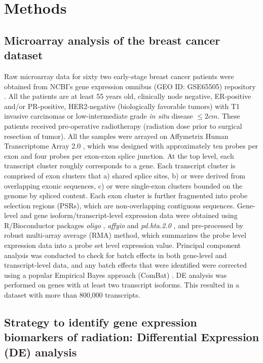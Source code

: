 \documentclass[hidelinks,11pt]{article}
\begin{document}
\section*{Methods}

\subsection*{Microarray analysis of the breast cancer dataset}

Raw microarray data for sixty two early-stage breast cancer patients were obtained from NCBI's gene expression omnibus (GEO ID: GSE65505) repository \cite{GEO}. All the patients are at least 55 years old, clinically node negative, ER-positive and/or PR-positive, HER2-negative (biologically favorable tumors) with T1 invasive carcinomas or low-intermediate grade \emph{in situ} disease $\leq 2cm$. These patients received pre-operative radiotherapy (radiation dose prior to surgical resection of tumor). All the samples were arrayed on Affymetrix Human Transcriptome Array 2.0 \cite{affymetrix}, which was designed with approximately ten probes per exon and four probes per exon-exon splice junction. At the top level, each transcript cluster roughly corresponds to a gene. Each transcript cluster is comprised of exon clusters that  a) shared splice sites, b) or were derived from overlapping exonic sequences, c) or were single-exon clusters bounded on the genome by spliced content. Each exon cluster is further fragmented into probe selection regions (PSRs), which are non-overlapping contiguous sequences. Gene-level and gene isoform/transcript-level expression data were obtained using R/Bioconductor packages \emph{oligo} \cite{oligo}, \emph{affyio} \cite{affyio} and \emph{pd.hta.2.0} \cite{pdhta}, and pre-processed by robust multi-array average (RMA) method, which summarizes the probe level expression data into a probe set level expression value. Principal component analysis was conducted to check for batch effects in both gene-level and transcript-level data, and any batch effects that were identified were corrected using a popular Empirical Bayes approach (ComBat) \cite{combat}. DE analysis was performed on genes with at least two transcript isoforms. This resulted in a dataset with more than 800,000 transcripts. 

\subsection*{Strategy to identify gene expression biomarkers of radiation: Differential Expression (DE) analysis}
\end{document}
